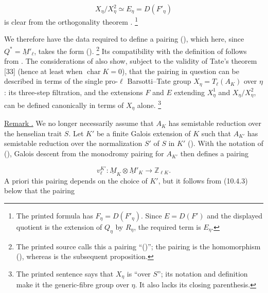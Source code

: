\begin{equation*}
X_\eta/X^2_\eta\simeq E_\eta=D(F'_\eta)
\end{equation*}
is clear from the orthogonality theorem .
\footnote{The printed formula has $F_\eta=D(F'_\eta)$. Since
$E=D(F')$ and the displayed quotient is the extension of $Q_\eta$ by
$R_\eta$, the required term is $E_\eta$.}

We therefore have the data required to define a pairing (), which
here, since $Q^*=\underline M'_\ell$, takes the form ().
\footnote{The printed source calls this a pairing ``()''; the pairing
is the homomorphism (), whereas  is the subsequent proposition.}
Its compatibility with the definition of  follows from . The
considerations of  also show, subject to the validity of Tate's theorem
[33] (hence at least when $\operatorname{char}K=0$), that the pairing in
question can be described in terms of the single pro-$\ell$
Barsotti--Tate group $X_\eta=T_\ell(A_K)$ over $\eta$: its three-step
filtration, and the extensions $F$ and $E$ extending $X^1_\eta$ and
$X_\eta/X^2_\eta$, can be defined canonically in terms of $X_\eta$ alone.
\footnote{The printed sentence says that $X_\eta$ is ``over $S$''; its
notation and definition make it the generic-fibre group over $\eta$. It
also lacks its closing parenthesis.}

\medskip
\noindent
\underline{Remark .} We no longer necessarily assume that $A_K$ has
semistable reduction over the henselian trait $S$. Let $K'$ be a finite
Galois extension of $K$ such that $A_{K'}$ has semistable reduction over
the normalization $S'$ of $S$ in $K'$ (). With the notation of (),
Galois descent from the monodromy pairing for $A_{K'}$ then defines a
pairing

\begin{equation}\tag{*}
v_\ell^{K'}:\underline M_K\otimes\underline M'_K
 \longrightarrow\mathbb Z_{\ell K}.
\end{equation}
A priori this pairing depends on the choice of $K'$, but it follows from
(10.4.3) below that the pairing

